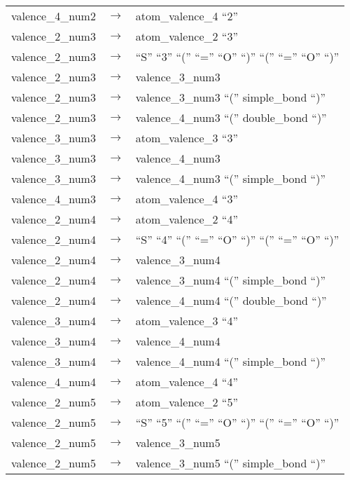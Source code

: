 \begin{longtable}{m{} p{} p{}}
    valence\_4\_num2 & $\rightarrow$ & atom\_valence\_4 ``2'' \\
    valence\_2\_num3 & $\rightarrow$ & atom\_valence\_2 ``3'' \\
    valence\_2\_num3 & $\rightarrow$ & ``S'' ``3'' ``('' ``='' ``O'' ``)'' ``('' ``='' ``O'' ``)'' \\
    valence\_2\_num3 & $\rightarrow$ & valence\_3\_num3 \\
    valence\_2\_num3 & $\rightarrow$ & valence\_3\_num3 ``('' simple\_bond ``)'' \\
    valence\_2\_num3 & $\rightarrow$ & valence\_4\_num3 ``('' double\_bond ``)'' \\
    valence\_3\_num3 & $\rightarrow$ & atom\_valence\_3 ``3'' \\
    valence\_3\_num3 & $\rightarrow$ & valence\_4\_num3 \\
    valence\_3\_num3 & $\rightarrow$ & valence\_4\_num3 ``('' simple\_bond ``)'' \\
    valence\_4\_num3 & $\rightarrow$ & atom\_valence\_4 ``3'' \\
    valence\_2\_num4 & $\rightarrow$ & atom\_valence\_2 ``4'' \\
    valence\_2\_num4 & $\rightarrow$ & ``S'' ``4'' ``('' ``='' ``O'' ``)'' ``('' ``='' ``O'' ``)'' \\
    valence\_2\_num4 & $\rightarrow$ & valence\_3\_num4 \\
    valence\_2\_num4 & $\rightarrow$ & valence\_3\_num4 ``('' simple\_bond ``)'' \\
    valence\_2\_num4 & $\rightarrow$ & valence\_4\_num4 ``('' double\_bond ``)'' \\
    valence\_3\_num4 & $\rightarrow$ & atom\_valence\_3 ``4'' \\
    valence\_3\_num4 & $\rightarrow$ & valence\_4\_num4 \\
    valence\_3\_num4 & $\rightarrow$ & valence\_4\_num4 ``('' simple\_bond ``)'' \\
    valence\_4\_num4 & $\rightarrow$ & atom\_valence\_4 ``4'' \\
    valence\_2\_num5 & $\rightarrow$ & atom\_valence\_2 ``5'' \\
    valence\_2\_num5 & $\rightarrow$ & ``S'' ``5'' ``('' ``='' ``O'' ``)'' ``('' ``='' ``O'' ``)'' \\
    valence\_2\_num5 & $\rightarrow$ & valence\_3\_num5 \\
    valence\_2\_num5 & $\rightarrow$ & valence\_3\_num5 ``('' simple\_bond ``)'' \\

\end{longtable}
